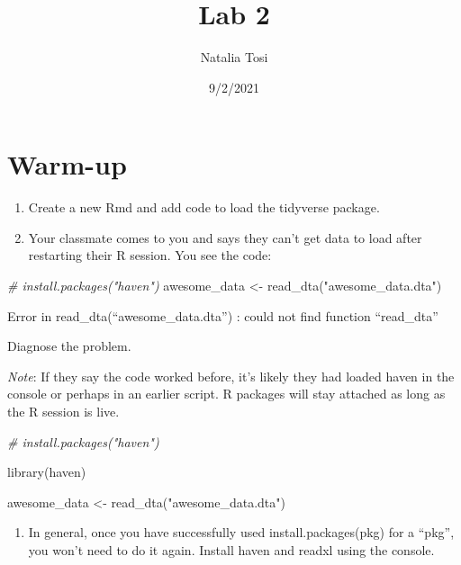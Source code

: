 \documentclass[
]{article}
\title{Lab 2}
\author{Natalia Tosi}
\date{9/2/2021}
\newenvironment{Shaded}{\begin{snugshade}}{\end{snugshade}}
\newcommand{\CommentTok}[1]{\textcolor[rgb]{0.56,0.35,0.01}{\textit{#1}}}
\newcommand{\FunctionTok}[1]{\textcolor[rgb]{0.00,0.00,0.00}{#1}}
\newcommand{\NormalTok}[1]{#1}
\newcommand{\OtherTok}[1]{\textcolor[rgb]{0.56,0.35,0.01}{#1}}
\newcommand{\StringTok}[1]{\textcolor[rgb]{0.31,0.60,0.02}{#1}}
\providecommand{\tightlist}{%
  \setlength{\itemsep}{0pt}\setlength{\parskip}{0pt}}
\begin{document}
\maketitle

\hypertarget{warm-up}{%
\section{Warm-up}\label{warm-up}}

\begin{enumerate}
\def\labelenumi{\arabic{enumi}.}
\item
  Create a new Rmd and add code to load the tidyverse package.
\item
  Your classmate comes to you and says they can't get data to load after
  restarting their R session. You see the code:
\end{enumerate}

\begin{Shaded}
\begin{Highlighting}[]
\CommentTok{\# install.packages("haven")}
\NormalTok{awesome\_data }\OtherTok{\textless{}{-}} \FunctionTok{read\_dta}\NormalTok{(}\StringTok{"awesome\_data.dta"}\NormalTok{)}
\end{Highlighting}
\end{Shaded}

Error in read\_dta(``awesome\_data.dta'') : could not find function
``read\_dta''

Diagnose the problem.

\emph{Note}: If they say the code worked before, it's likely they had
loaded haven in the console or perhaps in an earlier script. R packages
will stay attached as long as the R session is live.

\begin{Shaded}
\begin{Highlighting}[]
\CommentTok{\# install.packages("haven")}

\FunctionTok{library}\NormalTok{(haven)}

\NormalTok{awesome\_data }\OtherTok{\textless{}{-}} \FunctionTok{read\_dta}\NormalTok{(}\StringTok{"awesome\_data.dta"}\NormalTok{)}
\end{Highlighting}
\end{Shaded}

\begin{enumerate}
\def\labelenumi{\arabic{enumi}.}
\setcounter{enumi}{2}
\tightlist
\item
  In general, once you have successfully used install.packages(pkg) for
  a ``pkg'', you won't need to do it again. Install haven and readxl
  using the console.
\end{enumerate}
\end{document}

